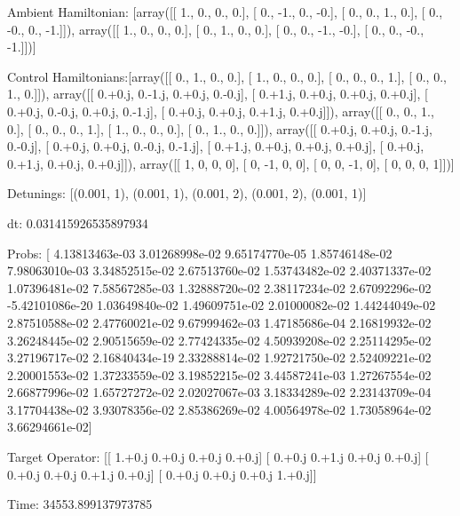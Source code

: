 \documentclass{article}
\begin{document}
    

\newpage

Ambient Hamiltonian: [array([[ 1.,  0.,  0.,  0.],
       [ 0., -1.,  0., -0.],
       [ 0.,  0.,  1.,  0.],
       [ 0., -0.,  0., -1.]]), array([[ 1.,  0.,  0.,  0.],
       [ 0.,  1.,  0.,  0.],
       [ 0.,  0., -1., -0.],
       [ 0.,  0., -0., -1.]])]

Control Hamiltonians:[array([[ 0.,  1.,  0.,  0.],
       [ 1.,  0.,  0.,  0.],
       [ 0.,  0.,  0.,  1.],
       [ 0.,  0.,  1.,  0.]]), array([[ 0.+0.j,  0.-1.j,  0.+0.j,  0.-0.j],
       [ 0.+1.j,  0.+0.j,  0.+0.j,  0.+0.j],
       [ 0.+0.j,  0.-0.j,  0.+0.j,  0.-1.j],
       [ 0.+0.j,  0.+0.j,  0.+1.j,  0.+0.j]]), array([[ 0.,  0.,  1.,  0.],
       [ 0.,  0.,  0.,  1.],
       [ 1.,  0.,  0.,  0.],
       [ 0.,  1.,  0.,  0.]]), array([[ 0.+0.j,  0.+0.j,  0.-1.j,  0.-0.j],
       [ 0.+0.j,  0.+0.j,  0.-0.j,  0.-1.j],
       [ 0.+1.j,  0.+0.j,  0.+0.j,  0.+0.j],
       [ 0.+0.j,  0.+1.j,  0.+0.j,  0.+0.j]]), array([[ 1,  0,  0,  0],
       [ 0, -1,  0,  0],
       [ 0,  0, -1,  0],
       [ 0,  0,  0,  1]])]

Detunings: [(0.001, 1), (0.001, 1), (0.001, 2), (0.001, 2), (0.001, 1)]

 dt: 0.031415926535897934

Probs: [  4.13813463e-03   3.01268998e-02   9.65174770e-05   1.85746148e-02
   7.98063010e-03   3.34852515e-02   2.67513760e-02   1.53743482e-02
   2.40371337e-02   1.07396481e-02   7.58567285e-03   1.32888720e-02
   2.38117234e-02   2.67092296e-02  -5.42101086e-20   1.03649840e-02
   1.49609751e-02   2.01000082e-02   1.44244049e-02   2.87510588e-02
   2.47760021e-02   9.67999462e-03   1.47185686e-04   2.16819932e-02
   3.26248445e-02   2.90515659e-02   2.77424335e-02   4.50939208e-02
   2.25114295e-02   3.27196717e-02   2.16840434e-19   2.33288814e-02
   1.92721750e-02   2.52409221e-02   2.20001553e-02   1.37233559e-02
   3.19852215e-02   3.44587241e-03   1.27267554e-02   2.66877996e-02
   1.65727272e-02   2.02027067e-03   3.18334289e-02   2.23143709e-04
   3.17704438e-02   3.93078356e-02   2.85386269e-02   4.00564978e-02
   1.73058964e-02   3.66294661e-02]

Target Operator: [[ 1.+0.j  0.+0.j  0.+0.j  0.+0.j]
 [ 0.+0.j  0.+1.j  0.+0.j  0.+0.j]
 [ 0.+0.j  0.+0.j  0.+1.j  0.+0.j]
 [ 0.+0.j  0.+0.j  0.+0.j  1.+0.j]]

Time: 34553.899137973785
\end{document}
